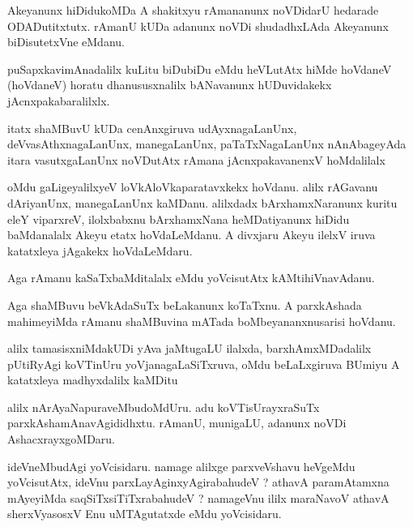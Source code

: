 \documentclass{article}
\begin{document}
\begin{mn}
Akeyanunx  hiDidukoMDa  A  shakitxyu  rAmananunx  noVDidarU  hedarade  ODADutitxtutx.  rAmanU  kUDa  adanunx  noVDi  
shudadhxLAda  Akeyanunx  biDisutetxVne  eMdanu.
\end{mn}

\begin{mn}
puSapxkavimAnadalilx  kuLitu  biDubiDu  eMdu  heVLutAtx  hiMde  hoVdaneV (hoVdaneV) horatu  dhanususxnalilx  
bANavanunx  hUDuvidakekx  jAcnxpakabaralilxlx.
\end{mn}

\begin{mn}
itatx  shaMBuvU  kUDa  cenAnxgiruva  udAyxnagaLanUnx,  deVvasAthxnagaLanUnx,  manegaLanUnx,  paTaTxNagaLanUnx  
nAnAbageyAda  itara  vasutxgaLanUnx  noVDutAtx  rAmana  jAcnxpakavanenxV  hoMdalilalx
\end{mn}

\begin{mn}
oMdu  gaLigeyalilxyeV  loVkAloVkaparatavxkekx  hoVdanu.  alilx  rAGavanu  dAriyanUnx,  manegaLanUnx  kaMDanu.  
alilxdadx  bArxhamxNaranunx  kuritu  eleY  viparxreV,  ilolxbabxnu  bArxhamxNana  heMDatiyanunx  hiDidu  baMdanalalx  
Akeyu  etatx  hoVdaLeMdanu.  A  divxjaru  Akeyu  ilelxV  iruva  katatxleya  jAgakekx  hoVdaLeMdaru.
\end{mn}

\begin{mn}
Aga  rAmanu  kaSaTxbaMditalalx  eMdu  yoVcisutAtx  kAMtihiVnavAdanu.
\end{mn}

\begin{mn}
Aga  shaMBuvu  beVkAdaSuTx  beLakanunx  koTaTxnu.  A  parxkAshada  mahimeyiMda  rAmanu  shaMBuvina  mATada  boMbeyananxnusarisi  hoVdanu.
\end{mn}

\begin{mn}
alilx  tamasisxniMdakUDi  yAva  jaMtugaLU  ilalxda,  barxhAmxMDadalilx  pUtiRyAgi  koVTinUru  yoVjanagaLaSiTxruva,  
oMdu  beLaLxgiruva  BUmiyu  A  katatxleya  madhyxdalilx  kaMDitu
\end{mn}

\begin{mn}
alilx  nArAyaNapuraveMbudoMdUru.  adu  koVTisUrayxraSuTx  parxkAshamAnavAgididhxtu.  rAmanU,  munigaLU,  adanunx  noVDi  AshacxrayxgoMDaru.
\end{mn}

\begin{mn}
ideVneMbudAgi  yoVcisidaru.  namage  alilxge  parxveVshavu  heVgeMdu  yoVcisutAtx,  ideVnu  parxLayAginxyAgirabahudeV ?  athavA  paramAtamxna  
mAyeyiMda  saqSiTxsiTiTxrabahudeV ?  namageVnu  ililx  maraNavoV  athavA  sherxVyasosxV  Enu  uMTAgutatxde  eMdu  yoVcisidaru.
\end{mn}
\end{document}
